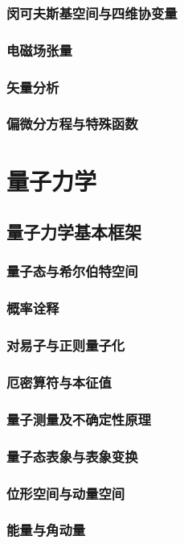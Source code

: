 \documentclass[a4paper]{report}
\begin{document}
\section{闵可夫斯基空间与四维协变量}
\section{电磁场张量}
\appendix
\section{矢量分析}
\section{偏微分方程与特殊函数}


\part{量子力学}
\chapter{量子力学基本框架}
\section{量子态与希尔伯特空间}
\section{概率诠释}
\section{对易子与正则量子化}
\section{厄密算符与本征值}
\section{量子测量及不确定性原理}
\section{量子态表象与表象变换}
\section{位形空间与动量空间}
\section{能量与角动量}
\end{document}
